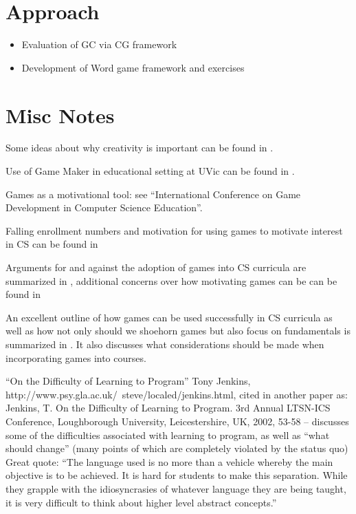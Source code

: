 \section{Approach}

\begin{itemize}
	\item Evaluation of GC via CG framework
	\item Development of Word game framework and exercises
\end{itemize}



\section{Misc Notes}

Some ideas about why creativity is important can be found in \cite{Farooq06}.

Use of Game Maker in educational setting at UVic can be found in \cite{Gooch08}.

Games as a motivational tool: see ``International Conference on Game Development in Computer Science Education''.

Falling enrollment numbers and motivation for using games to motivate interest in CS can be found in \cite{Barnes08}

Arguments for and against the adoption of games into CS curricula are summarized in \cite{Walker03}, additional concerns over how motivating games can be can be found in \cite{DiSalvo09}

An excellent outline of how games can be used successfully in CS curricula as well as how not only should we shoehorn games but also focus on fundamentals is summarized in \cite{Bayliss09}.  It also discusses what considerations should be made when incorporating games into courses.

``On the Difficulty of Learning to Program'' Tony Jenkins, http://www.psy.gla.ac.uk/~steve/localed/jenkins.html, cited in another paper as:
Jenkins, T. On the Difficulty of Learning to Program. 3rd Annual LTSN-ICS Conference, Loughborough University, Leicestershire, UK, 2002, 53-58 -- discusses some of the difficulties associated with learning to program, as well as ``what should change'' (many points of which are completely violated by the status quo)  Great quote: ``The language used is no more than a vehicle whereby the main objective is to be achieved. It is hard for students to make this separation. While they grapple with the idiosyncrasies of whatever language they are being taught, it is very difficult to think about higher level abstract concepts.''

